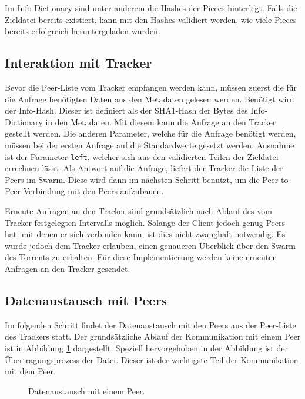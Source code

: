 Im Info-Dictionary sind unter anderem die Hashes der Pieces hinterlegt. Falls die Zieldatei bereits existiert, kann mit den Hashes validiert werden, wie viele Pieces bereits erfolgreich heruntergeladen wurden. 

\subsection{Interaktion mit Tracker}

Bevor die Peer-Liste vom Tracker empfangen werden kann, müssen zuerst die für die Anfrage benötigten Daten aus den Metadaten gelesen werden. Benötigt wird der Info-Hash. Dieser ist definiert als der SHA1-Hash der Bytes des Info-Dictionary in den Metadaten. Mit diesem kann die Anfrage an den Tracker gestellt werden. Die anderen Parameter, welche für die Anfrage benötigt werden, müssen bei der ersten Anfrage auf die Standardwerte gesetzt werden. Ausnahme ist der Parameter \verb|left|, welcher sich aus den validierten Teilen der Zieldatei errechnen lässt. Als Antwort auf die Anfrage, liefert der Tracker die Liste der Peers im Swarm. Diese wird dann im nächsten Schritt benutzt, um die Peer-to-Peer-Verbindung mit den Peers aufzubauen.

Erneute Anfragen an den Tracker sind grundsätzlich nach Ablauf des vom Tracker festgelegten Intervalls möglich. Solange der Client jedoch genug Peers hat, mit denen er sich verbinden kann, ist dies nicht zwanghaft notwendig. Es würde jedoch dem Tracker erlauben, einen genaueren Überblick über den Swarm des Torrents zu erhalten. Für diese Implementierung werden keine erneuten Anfragen an den Tracker gesendet. 

\subsection{Datenaustausch mit Peers}

Im folgenden Schritt findet der Datenaustausch mit den Peers aus der Peer-Liste des Trackers statt. Der grundsätzliche Ablauf der Kommunikation mit einem Peer ist in Abbildung \ref{fig:BitTorrentPieceProcess} dargestellt. Speziell hervorgehoben in der Abbildung ist der Übertragungsprozess der Datei. Dieser ist der wichtigste Teil der Kommunikation mit dem Peer. 

\begin{figure}[]
    \centering
    \caption{Datenaustausch mit einem Peer.}
    \label{fig:BitTorrentPieceProcess}
\end{figure}

